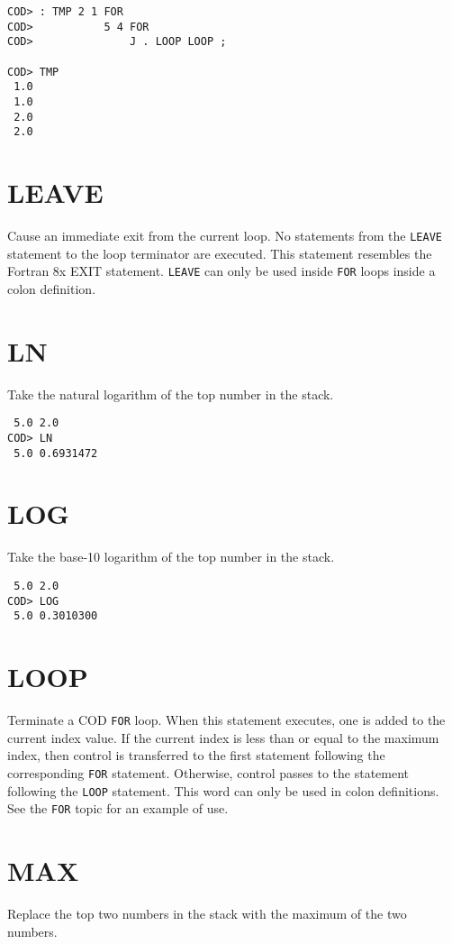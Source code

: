 \medskip
{}
\begin{verbatim}
COD> : TMP 2 1 FOR
COD>           5 4 FOR
COD>               J . LOOP LOOP ;

COD> TMP
 1.0
 1.0
 2.0
 2.0
\end{verbatim}

\section*{LEAVE}
Cause an immediate exit from the current loop.
No statements from the {\tt LEAVE} statement to the loop terminator
are executed.
This statement resembles the Fortran 8x EXIT statement.
{\tt LEAVE} can only be used inside {\tt FOR} loops inside
a colon definition.

\section*{LN}
Take the natural logarithm of the top number in the stack.

\medskip
{}
\begin{verbatim}
 5.0 2.0
COD> LN
 5.0 0.6931472
\end{verbatim}

\section*{LOG}
Take the base-10 logarithm of the top number in the stack.

\medskip
{}
\begin{verbatim}
 5.0 2.0
COD> LOG
 5.0 0.3010300
\end{verbatim}

\section*{LOOP}
Terminate a COD {\tt FOR} loop.
When this statement executes,
one is added to the current index value.
If the current index is less than or equal to the maximum index,
then control is transferred to the first statement
following the corresponding {\tt FOR} statement.
Otherwise, control passes to the statement following the {\tt LOOP} statement.
This word can only be used in colon definitions.
See the {\tt FOR} topic for an example of use.

\section*{MAX}
Replace the top two numbers in the stack with the maximum of the two numbers.

